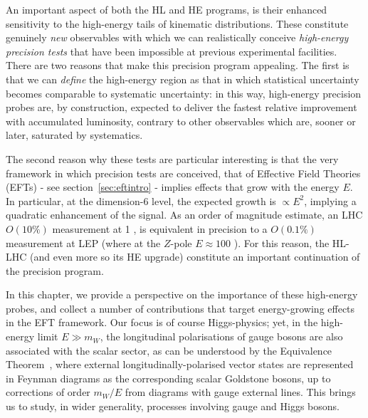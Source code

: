 An important aspect of both the HL and HE programs, is their enhanced sensitivity to the high-energy tails of kinematic distributions.  
These constitute genuinely \emph{new} observables with which we can realistically  conceive \emph{high-energy precision tests} that have been impossible at previous experimental facilities.
 There are two reasons that make this precision program appealing. The first is that we can \emph{define} the high-energy region as that in which statistical uncertainty becomes comparable to systematic uncertainty: in this way, high-energy precision probes are, by construction, expected to deliver the fastest relative improvement with accumulated luminosity, contrary to other observables which are, sooner or later, saturated by systematics.

The second reason why these tests are particular interesting is that the very framework in which precision tests are conceived, that of Effective Field Theories (EFTs) -   see section~\ref{sec:eftintro} -  implies effects that grow with the energy $E$. In particular, at the dimension-6 level, the expected growth is $\propto E^2$, implying a quadratic enhancement of the signal. 
As an order of magnitude estimate, an LHC $O(10\%)$ measurement at 1 \UTeV, is equivalent in precision to a $O(0.1\%)$ measurement at LEP (where at the $Z$-pole $E\approx 100$ \UGeV). For this reason, the HL-LHC (and even more so its HE upgrade) constitute an important continuation of the precision program. 

In this chapter, we provide a perspective on the importance of these high-energy probes, and collect a number of contributions that target energy-growing effects in the EFT framework.
Our focus is of course Higgs-physics; yet, in the  high-energy  limit $E\gg m_{W}$, the longitudinal polarisations of gauge bosons are also associated with the scalar sector, as can be understood by the Equivalence Theorem~\cite{Chanowitz:1985hj,Wulzer:2013mza}, where external longitudinally-polarised vector states are represented in Feynman diagrams as the corresponding
scalar Goldstone bosons, up to corrections of order $m_W/E$ from diagrams with gauge external lines.
This brings us to study, in wider generality, processes involving gauge  and Higgs bosons. %

